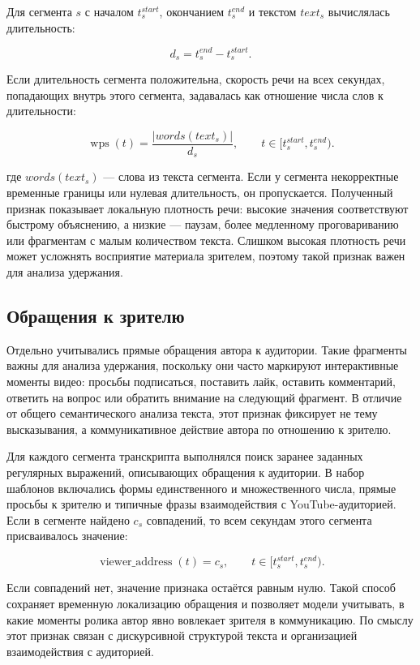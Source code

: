 \documentclass[times]{itmo-student-thesis}
\begin{document}
Для сегмента $s$ с началом $t_s^{start}$, окончанием $t_s^{end}$ и текстом $text_s$ вычислялась длительность:

\[
d_s=t_s^{end}-t_s^{start}.
\]

Если длительность сегмента положительна, скорость речи на всех секундах, попадающих внутрь этого сегмента, задавалась как отношение числа слов к длительности:

\[
\operatorname{wps}(t)=\frac{|words(text_s)|}{d_s}, \qquad t\in[t_s^{start},t_s^{end}).
\]

где $words(text_s)$ — слова из текста сегмента. Если у сегмента некорректные временные границы или нулевая длительность, он пропускается. Полученный признак показывает локальную плотность речи: высокие значения соответствуют быстрому объяснению, а низкие — паузам, более медленному проговариванию или фрагментам с малым количеством текста. Слишком высокая плотность речи может усложнять восприятие материала зрителем, поэтому такой признак важен для анализа удержания.

\subsection{Обращения к зрителю}

Отдельно учитывались прямые обращения автора к аудитории. Такие фрагменты важны для анализа удержания, поскольку они часто маркируют интерактивные моменты видео: просьбы подписаться, поставить лайк, оставить комментарий, ответить на вопрос или обратить внимание на следующий фрагмент. В отличие от общего семантического анализа текста, этот признак фиксирует не тему высказывания, а коммуникативное действие автора по отношению к зрителю.

Для каждого сегмента транскрипта выполнялся поиск заранее заданных регулярных выражений, описывающих обращения к аудитории. В набор шаблонов включались формы единственного и множественного числа, прямые просьбы к зрителю и типичные фразы взаимодействия с YouTube-аудиторией. Если в сегменте найдено $c_s$ совпадений, то всем секундам этого сегмента присваивалось значение:

\[
\operatorname{viewer\_address}(t)=c_s, \qquad t\in[t_s^{start},t_s^{end}).
\]

Если совпадений нет, значение признака остаётся равным нулю. Такой способ сохраняет временную локализацию обращения и позволяет модели учитывать, в какие моменты ролика автор явно вовлекает зрителя в коммуникацию. По смыслу этот признак связан с дискурсивной структурой текста и организацией взаимодействия с аудиторией.
\end{document}
